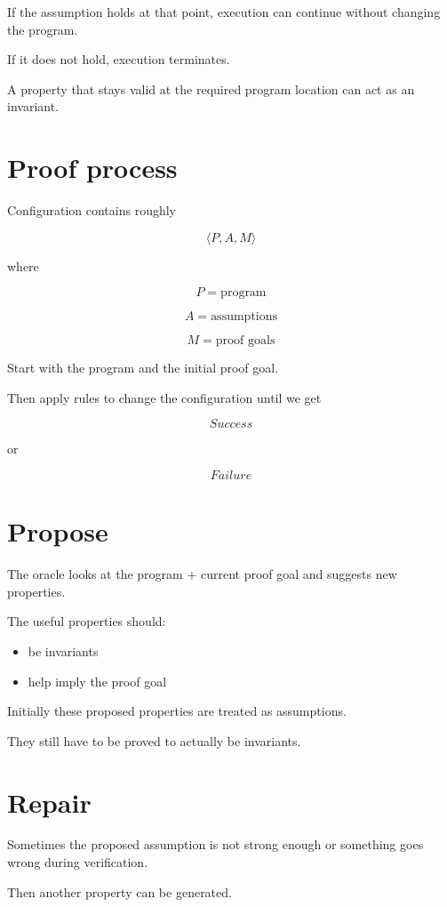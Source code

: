 \documentclass[11pt]{book}
\begin{document}
If the assumption holds at that point, execution can
continue without changing the program.

If it does not hold, execution terminates.

A property that stays valid at the required program
location can act as an invariant.

\section{Proof process}

Configuration contains roughly

\[
\langle P,A,M\rangle
\]

where

\[
P = \text{program}
\]

\[
A = \text{assumptions}
\]

\[
M = \text{proof goals}
\]

Start with the program and the initial proof goal.

Then apply rules to change the configuration until
we get

\[
Success
\]

or

\[
Failure
\]

\section{Propose}

The oracle looks at the program + current proof goal
and suggests new properties.

The useful properties should:

\begin{itemize}
    \item be invariants
    \item help imply the proof goal
\end{itemize}

Initially these proposed properties are treated
as assumptions.

They still have to be proved to actually be invariants.

\section{Repair}

Sometimes the proposed assumption is not strong enough
or something goes wrong during verification.

Then another property can be generated.
\end{document}
